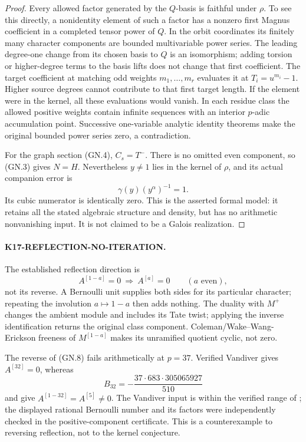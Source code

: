 \begin{proof}
Every allowed factor generated by the \(Q\)-basis is faithful
under \(\rho\). To see this directly, a nonidentity element of
such a factor has a nonzero first Magnus coefficient in a completed
tensor power of \(Q\). In the orbit coordinates its finitely many
character components are bounded multivariable power series.
The leading degree-one change from its chosen basis to \(Q\)
is an isomorphism; adding torsion or higher-degree terms to the
basis lifts does not change that first coefficient. The target
coefficient at matching odd weights \(m_1,\ldots,m_r\) evaluates
it at \(T_i=u^{m_i}-1\). Higher source degrees cannot contribute
to that first target length. If the element were in the kernel,
all these evaluations would vanish. In each residue class the
allowed positive weights contain infinite sequences with an
interior \(p\)-adic accumulation point. Successive one-variable
analytic identity theorems make the original bounded power
series zero, a contradiction.

For the graph section (GN.4), \(C_s=T^-\). There is no omitted
even component, so (GN.3) gives \(N=H\). Nevertheless
\(y\ne1\) lies in the kernel of \(\rho\), and its actual
companion error is
\[
 \gamma(y)(y^\alpha)^{-1}=1.
\]
Its cubic numerator is identically zero. This is the asserted
formal model: it retains all the stated algebraic structure and
density, but has no arithmetic nonvanishing input. It is not
claimed to be a Galois realization.
\end{proof}

\paragraph{K17-REFLECTION-NO-ITERATION.}
The established reflection direction is
\[
 A^{[1-a]}=0\ \Longrightarrow\ A^{[a]}=0
 \qquad(a\text{ even}),
 \tag{GN.8}
\]
not its reverse. A Bernoulli unit supplies both sides for its
particular character; repeating the involution \(a\mapsto1-a\)
then adds nothing. The duality with \(M^+\) changes the ambient
module and includes its Tate twist; applying the inverse
identification returns the original class component.
Coleman/Wake--Wang-Erickson freeness of \(M^{[1-a]}\) makes its
unramified quotient cyclic, not zero.

The reverse of (GN.8) fails arithmetically at \(p=37\).
Verified Vandiver gives \(A^{[32]}=0\), whereas
\[
 B_{32}=-\frac{37\cdot683\cdot305065927}{510}
\]
and \cite[Main Theorem~1.1, p.~151]{Ribet1976} give
\(A^{[1-32]}=A^{[5]}\ne0\). The Vandiver input is within the
verified range of \cite{HartHarveyOng2017}; the displayed rational
Bernoulli number and its factors were independently checked in
the positive-component certificate. This is a counterexample to
reversing reflection, not to the kernel conjecture.

